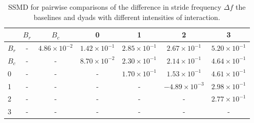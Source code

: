 \begin{table}
\centering
\caption{SSMD for pairwise comparisons of the difference in stride frequency $\Delta f$ the baselines and dyads with different intensities of interaction.}
\label{tab:ssmd_delta_f}
\begin{tabular}{lcccccc}
\toprule
 & $B_r$ & $B_c$ & 0 & 1 & 2 & 3 \\
\midrule
$B_r$ & - & $4.86 \times 10^{-2}$ & $1.42 \times 10^{-1}$ & $2.85 \times 10^{-1}$ & $2.67 \times 10^{-1}$ & $5.20 \times 10^{-1}$ \\
$B_c$ & - & - & $8.70 \times 10^{-2}$ & $2.30 \times 10^{-1}$ & $2.14 \times 10^{-1}$ & $4.64 \times 10^{-1}$ \\
0 & - & - & - & $1.70 \times 10^{-1}$ & $1.53 \times 10^{-1}$ & $4.61 \times 10^{-1}$ \\
1 & - & - & - & - & $-4.89 \times 10^{-3}$ & $2.98 \times 10^{-1}$ \\
2 & - & - & - & - & - & $2.77 \times 10^{-1}$ \\
3 & - & - & - & - & - & - \\
\bottomrule
\end{tabular}
\end{table}
